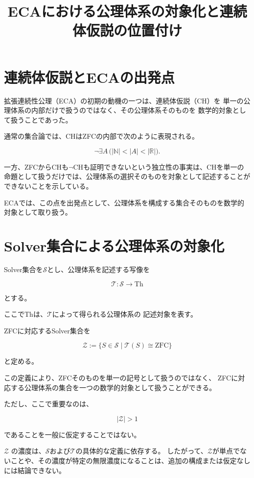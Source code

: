\documentclass[12pt,a4paper]{article}
\title{ECAにおける公理体系の対象化と連続体仮説の位置付け}
\author{}
\date{}
\begin{document}
\maketitle

\section{連続体仮説とECAの出発点}

拡張連続性公理（ECA）の初期の動機の一つは、連続体仮説（CH）を
単一の公理体系の内部だけで扱うのではなく、その公理体系そのものを
数学的対象として扱うことであった。

通常の集合論では、CHはZFCの内部で次のように表現される。

\[
\neg\exists A\,
\bigl(
|\mathbb{N}|<|A|<|\mathbb{R}|
\bigr).
\]

一方、ZFCからCHも$\neg\mathrm{CH}$も証明できないという独立性の事実は、CHを単一の命題として扱うだけでは、公理体系の選択そのものを対象として記述することができないことを示している。

ECAでは、この点を出発点として、公理体系を構成する集合そのものを数学的対象として取り扱う。

\section{Solver集合による公理体系の対象化}

Solver集合を$\mathcal{S}$とし、公理体系を記述する写像を

\[
\mathcal{T}:\mathcal{S}\to\mathrm{Th}
\]

とする。

ここで$\mathrm{Th}$は、$\mathcal{T}$によって得られる公理体系の
記述対象を表す。

ZFCに対応するSolver集合を

\[
\mathcal{Z}
:=
\{S\in\mathcal{S}\mid
\mathcal{T}(S)\cong\mathrm{ZFC}\}
\]

と定める。

この定義により、ZFCそのものを単一の記号として扱うのではなく、
ZFCに対応する公理体系の集合を一つの数学的対象として扱うことができる。

ただし、ここで重要なのは、

\[
|\mathcal{Z}|>1
\]

であることを一般に仮定することではない。

$\mathcal{Z}$ の濃度は、$\mathcal{S}$および$\mathcal{T}$の具体的な定義に依存する。
したがって、$\mathcal{Z}$が単点でないことや、その濃度が特定の無限濃度になることは、追加の構成または仮定なしには結論できない。
\end{document}
